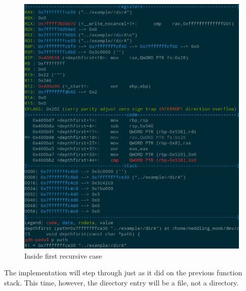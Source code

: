 \documentclass[a4paper,12pt,sffamily]{article}
\begin{document}
\begin{figure}[H]
	\centering
	\includegraphics[width=1\linewidth]{./images/9}
	\caption[inside_first_recursive_case]{Inside first recursive case}
	\label{fig:10}
\end{figure}
The implementation will step through just as it did on the previous function stack. This time, however, the directory entry will be a file, not a directory.
\end{document}
